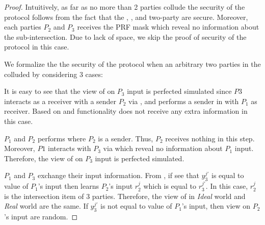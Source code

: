 \begin{proof}
	
	\medskip

Intuitively, as far as no more than 2 parties collude  the security of the protocol follows from the fact that the \batchOPRF, \OPPRF, and two-party \PSI are secure. Moreover, each parties $P_2$ and $P_3$ receives the PRF mask which reveal no information about the sub-intersection. Due to lack of space, we skip the proof of security of the protocol in this case. 

We formalize the the security of the protocol when an arbitrary two parties in the  colluded by considering 3 cases:

	 It is easy to see that the view of \adv on $P_3$ input is perfected simulated since $P3$ interacts as a receiver with a sender $P_2$ via \OPPRF, and performs a sender in \PSI with $P_1$ as receiver. Based on \OPPRF and \PSI functionality  \adv does not receive any extra information in this case.

$P_1$ and $P_2$ performs \batchOPRF where $P_2$ is a sender. Thus, $P_2$ receives nothing in this step. Moreover, $P1$ interacts with $P_3$ via \PSI which reveal no information about $P_1$ input.  Therefore, the view of \adv on $P_3$ input is perfected simulated.

$P_1$ and $P_3$ exchange their input information. From \OPPRF, if \Adv see that $y^{j'}_3$ is equal to \batchOPRF value of $P_1$'s input then \Adv learns $P_2$'s input $r^j_2$ which is equal to $r^{j'}_3$. In this case, $r^j_2$ is the intersection item of 3 parties. Therefore, the view of \Adv in \textit{Ideal} world and \textit{Real} world are the same. If $y^{j'}_3$ is not equal to \batchOPRF value of $P_1$'s input, then \Adv view on $P_2$'s input are random. 
\end{proof}